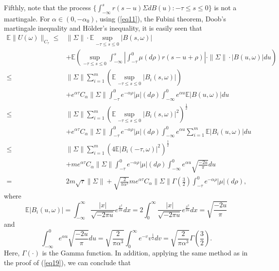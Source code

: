 \documentclass[preprint,12pt]{elsarticle}
\begin{document}
Fifthly, note that the process $\{\int_{-\infty}^{s}r(s-u)\Sigma dB(u):-\tau\leq s\leq0\}$ is not a martingale. For $\alpha\in(0,-\alpha_0)$, using (\ref{eq11}), the Fubini theorem, Doob's martingale inequality and H\"{o}lder's inequality, it is easily seen that
\begin{align}\label{eq19}
\mathbb{E}\|U(\omega)\|_{C_\tau}\leq&\|\Sigma\|\cdot\mathbb{E}\sup_{-\tau\leq s\leq0}|B(s,\omega)|\nonumber\\
&+\mathbb{E}\left(\sup_{-\tau\leq s\leq0}\int_{-\infty}^{s}\left|\int_{-\tau}^0\mu(d\rho)r(s-u+\rho)\right|\cdot\|\Sigma\|\cdot|B(u,\omega)|du\right)\nonumber\\
\leq&\|\Sigma\|\sum_{i=1}^m\left(\mathbb{E}\sup_{-\tau\leq s\leq0}|B_i(s,\omega)|\right)\nonumber\\
&+e^{\alpha\tau}C_\alpha\|\Sigma\|\int_{-\tau}^0e^{-\alpha\rho}|\mu|(d\rho)\int_{-\infty}^0e^{\alpha u}\mathbb{E}|B(u,\omega)|du\nonumber\\
\leq&\|\Sigma\|\sum_{i=1}^m\left(\mathbb{E}\sup_{-\tau\leq s\leq0}|B_i(s,\omega)|^2\right)^\frac12\nonumber\\
&+e^{\alpha\tau}C_\alpha\|\Sigma\|\int_{-\tau}^0e^{-\alpha\rho}|\mu|(d\rho)\int_{-\infty}^0e^{\alpha u}\sum_{i=1}^m\mathbb{E}|B_i(u,\omega)|du\nonumber\\
\leq&\|\Sigma\|\sum_{i=1}^m\left(4\mathbb{E}|B_i(-\tau,\omega)|^2\right)^\frac12\nonumber\\
&+me^{\alpha\tau}C_\alpha\|\Sigma\|\int_{-\tau}^0e^{-\alpha\rho}|\mu|(d\rho)\int_{-\infty}^0e^{\alpha u}\sqrt{\frac{-2u}{\pi}}du\nonumber\\
=&2m\sqrt\tau\|\Sigma\|+\sqrt{\frac{2}{\pi\alpha^3}}me^{\alpha\tau}C_\alpha\|\Sigma\|\Gamma\left(\frac32\right)\int_{-\tau}^0e^{-\alpha\rho}|\mu|(d\rho),
\end{align}
where
\[\mathbb{E}|B_i(u,\omega)|=\int_{-\infty}^{\infty}\frac{|x|}{\sqrt{-2\pi u}}e^{\frac{x^2}{2u}}dx=2\int_{0}^{\infty}\frac{|x|}{\sqrt{-2\pi u}}e^{\frac{x^2}{2u}}dx=\sqrt{\frac{-2u}{\pi}}\]
and
\[\int_{-\infty}^0e^{\alpha u}\sqrt{\frac{-2u}{\pi}}du=\sqrt{\frac{2}{\pi\alpha^3}}\int_0^{\infty}e^{-v}v^{\frac12}dv=\sqrt{\frac{2}{\pi\alpha^3}}\Gamma\left(\frac32\right).\]
Here, $\Gamma(\cdot)$ is the Gamma function. In addition, applying the same method as in the proof of (\ref{eq19}), we can conclude that
\end{document}
